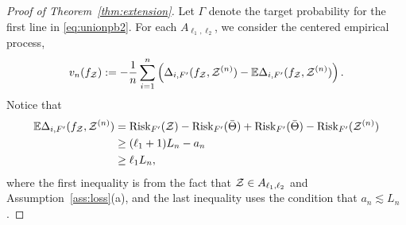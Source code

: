 \documentclass[twoside,11pt]{article}
\theoremstyle{plain}
\theoremstyle{definition}
\def\risk{\textup{Risk}}
\begin{document}
\begin{proof}[Proof of Theorem~\ref{thm:extension}]
Let $\Gamma$ denote the target probability for the first line in \eqref{eq:unionpb2}.   For each $A_{\ell_1,\ell_2}$, we consider the centered empirical process,
\begin{align}\label{eq:vn2}
v_n(f_{\mathcal{Z}}) := -\frac{1}{n}\sum_{i=1}^n \left(\Delta_{i,F'}(f_{\mathcal{Z}},\mathcal{Z}^{(n)})- \mathbb{E}\Delta_{i,F'}(f_{\mathcal{Z}},\mathcal{Z}^{(n)})\right).
\end{align}
Notice  that 
\begin{align}
 \mathbb{E}\Delta_{i,F'}(f_\tZ,\tZ^{(n)}) &=  \risk_{F'}({\tZ})-\risk_{F'}(\bar\Theta)+\risk_{F'}({\bar\Theta})-\risk_{F'}(\tZ^{(n)})\\&\geq (\ell_1+1)L_n-a_n\\&\geq \ell_1 L_n,
\end{align}
where the first inequality is from the fact that $\mathcal{Z}\in A_{\ell_1,\ell_2}$ and Assumption~\ref{ass:loss}(a), and the last inequality uses the condition that $a_n\lesssim L_n$.


\end{proof}
\end{document}
